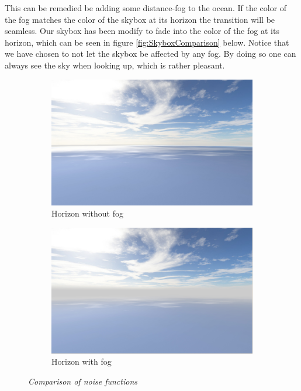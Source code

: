 This can be remedied be adding some distance-fog to the ocean. If the color of the fog matches the color of the skybox at its horizon the transition will be seamless. Our skybox has been modify to fade into the color of the fog at its horizon, which can be seen in figure \ref{fig:SkyboxComparison} below. Notice that we have chosen to not let the skybox be affected by any fog. By doing so one can always see the sky when looking up, which is rather pleasant. 

\begin{figure}[H]
\begin{subfigure}{.5\textwidth}
  \centering
  \includegraphics[width=0.9\linewidth]{images/horizonNoFog.jpg}
  \caption{Horizon without fog}
  \label{fig:HorizonNoFog}
\end{subfigure}%
\begin{subfigure}{.5\textwidth}
  \centering
  \includegraphics[width=0.9\linewidth]{images/horizonFog.jpg}
  \caption{Horizon with fog}
  \label{fig:HorizonFog}
\end{subfigure}
\caption[Noise comparison]{\textit{Comparison of noise functions}}
\label{fig:HorizonFogComparison}
\end{figure}

